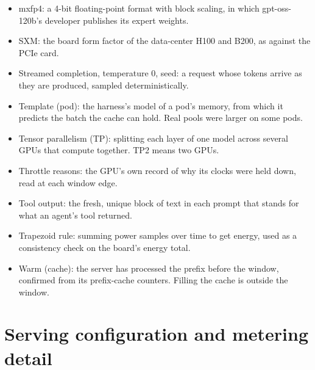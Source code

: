 \documentclass[11pt]{article}
\begin{document}
\begin{small}
\begin{itemize}
\item mxfp4: a 4-bit floating-point format with block scaling, in which gpt-oss-120b's developer publishes its expert weights.
\item SXM: the board form factor of the data-center H100 and B200, as against the PCIe card.
\item Streamed completion, temperature 0, seed: a request whose tokens arrive as they are produced, sampled deterministically.
\item Template (pod): the harness's model of a pod's memory, from which it predicts the batch the cache can hold. Real pools were larger on some pods.
\item Tensor parallelism (TP): splitting each layer of one model across several GPUs that compute together. TP2 means two GPUs.
\item Throttle reasons: the GPU's own record of why its clocks were held down, read at each window edge.
\item Tool output: the fresh, unique block of text in each prompt that stands for what an agent's tool returned.
\item Trapezoid rule: summing power samples over time to get energy, used as a consistency check on the board's energy total.
\item Warm (cache): the server has processed the prefix before the window, confirmed from its prefix-cache counters. Filling the cache is outside the window.
\end{itemize}
\end{small}

\section{Serving configuration and metering detail}\label{app:detail}
\end{document}
